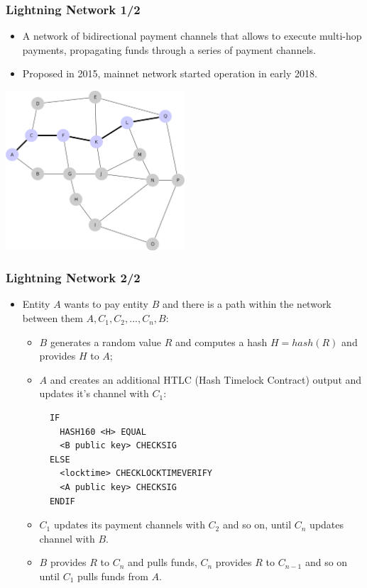 \documentclass{beamer}
\begin{document}
\begin{frame}[fragile]
  \frametitle{Lightning Network 1/2}
  \begin{itemize}
  \item A network of bidirectional payment channels that allows to execute
    multi-hop payments, propagating funds through a series of payment channels.
  \item Proposed in 2015, mainnet network started operation in early 2018.
  \end{itemize}
  \begin{center}
    \includegraphics[width=0.5\textwidth]{ln}
  \end{center}
\end{frame}

\begin{frame}[fragile]
  \frametitle{Lightning Network 2/2}
  \begin{itemize}
  \item Entity $A$ wants to pay entity $B$ and there is a path within the network
    between them $A, C_1, C_2, ..., C_n, B$:
    \begin{itemize}
    \item $B$ generates a random value $R$ and computes a hash $H = hash(R)$ and
      provides $H$ to $A$;
    \item $A$ and creates an additional HTLC (Hash Timelock Contract) output and
      updates it's channel with $C_1$:
      \begin{verbatim}
  IF 
    HASH160 <H> EQUAL
    <B public key> CHECKSIG
  ELSE
    <locktime> CHECKLOCKTIMEVERIFY
    <A public key> CHECKSIG
  ENDIF
      \end{verbatim}
    \item $C_1$ updates its payment channels with $C_2$ and so on, until $C_n$
      updates channel with $B$.
    \item $B$ provides $R$ to $C_n$ and pulls funds, $C_n$ provides $R$ to
      $C_{n-1}$ and so on until $C_1$ pulls funds from $A$.
    \end{itemize}
  \end{itemize}
\end{frame}
\end{document}
